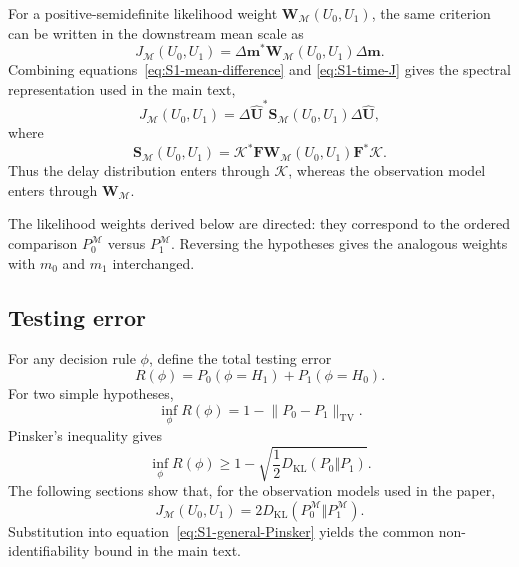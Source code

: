 For a positive-semidefinite likelihood weight \(\mathbf W_{\mathcal M}(U_0,U_1)\), the same criterion can be written in the downstream mean scale as
\begin{equation}
J_{\mathcal M}(U_0,U_1)
=
\Delta\mathbf m^*
\mathbf W_{\mathcal M}(U_0,U_1)
\Delta\mathbf m .
\label{eq:S1-time-J}
\end{equation}
Combining equations~\eqref{eq:S1-mean-difference} and \eqref{eq:S1-time-J} gives the spectral representation used in the main text,
\begin{equation}
J_{\mathcal M}(U_0,U_1)
=
\Delta\widehat{\mathbf U}^{*}
\mathbf S_{\mathcal M}(U_0,U_1)
\Delta\widehat{\mathbf U},
\label{eq:S1-common-J}
\end{equation}
where
\begin{equation}
\mathbf S_{\mathcal M}(U_0,U_1)
=
\mathcal K^{*}
\mathbf F\mathbf W_{\mathcal M}(U_0,U_1)\mathbf F^{*}
\mathcal K.
\label{eq:S1-S-operator}
\end{equation}
Thus the delay distribution enters through \(\mathcal K\), whereas the observation model enters through \(\mathbf W_{\mathcal M}\).

The likelihood weights derived below are directed: they correspond to the ordered comparison \(P_0^{\mathcal M}\) versus \(P_1^{\mathcal M}\). Reversing the hypotheses gives the analogous weights with \(m_0\) and \(m_1\) interchanged.

\subsection{Testing error}

For any decision rule \(\phi\), define the total testing error
\[
R(\phi) = P_0(\phi=H_1)+P_1(\phi=H_0).
\]
For two simple hypotheses,
\[
\inf_\phi R(\phi)
= 1-\lVert P_0-P_1\rVert_{\mathrm{TV}}.
\]
Pinsker's inequality gives
\begin{equation}
\inf_\phi R(\phi)
\ge
1-
\sqrt{\frac12D_{\mathrm{KL}}(P_0\Vert P_1)}.
\label{eq:S1-general-Pinsker}
\end{equation}
The following sections show that, for the observation models used in the paper,
\begin{equation}
J_{\mathcal M}(U_0,U_1)
=
2D_{\mathrm{KL}}
\left(
P_0^{\mathcal M}\Vert P_1^{\mathcal M}
\right).
\label{eq:S1-target-equivalence}
\end{equation}
Substitution into equation~\eqref{eq:S1-general-Pinsker} yields the common non-identifiability bound in the main text.

